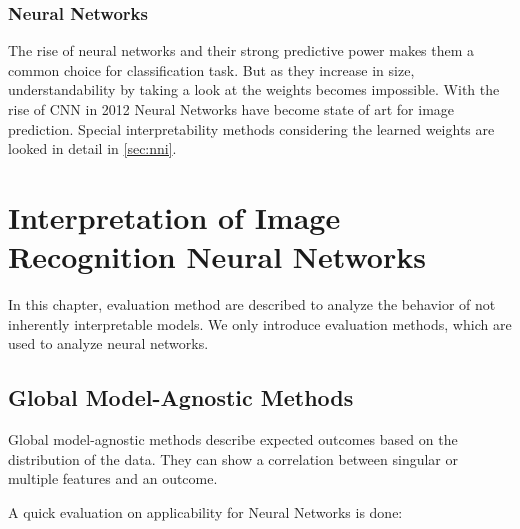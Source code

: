 
\subsection{Neural Networks}

The rise of neural networks and their strong predictive power makes them a common choice for classification task. But as they increase in size, understandability by taking a look at the weights becomes impossible. With the rise of CNN in 2012  \cite{krizhevsky2012} Neural Networks have become state of art for image prediction. Special interpretability methods considering the learned weights are looked in detail in \ref{sec:nni}.


\chapter{Interpretation of Image Recognition Neural Networks}

In this chapter, evaluation method are described to analyze the behavior of not inherently interpretable models. We only introduce evaluation methods, which are used to analyze neural networks.

\section{Global Model-Agnostic Methods}

Global model-agnostic methods describe expected outcomes based on the distribution of the data. They can show a correlation between singular or multiple features and an outcome.

A quick evaluation on applicability for Neural Networks is done:

